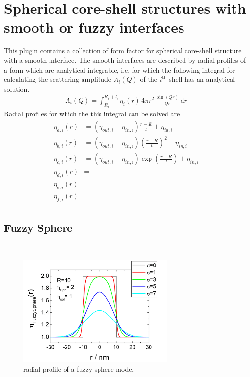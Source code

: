 \clearpage
\section{Spherical core-shell structures with smooth or fuzzy interfaces}
This plugin contains a collection of form factor for spherical core-shell structure with a smooth interface.
The smooth interfaces are described by radial profiles of a form which are analytical integrable, i.e. for which
the following integral for calculating the scattering amplitude $A_i(Q)$ of the $i^\textrm{th}$ shell
has an analytical solution.
\begin{align}
A_i(Q) = \int_{R_i}^{R_i+t_i} \eta_i(r)\, 4\pi r^2 \,\frac{\sin\left( Qr\right)}{Qr} \, \mathrm{d}r
\end{align}
Radial profiles for which the this integral can be solved are
\begin{subequations}
\begin{align}
\eta_{a,i}(r) &= \left(\eta_{out,i}-\eta_{in,i}\right)\frac{r-R}{t}+\eta_{in,i}\\
\eta_{b,i}(r) &= \left(\eta_{out,i}-\eta_{in,i}\right)\left(\frac{r-R}{t}\right)^2+\eta_{in,i}\\
\eta_{c,i}(r) &= \left(\eta_{out,i}-\eta_{in,i}\right)\exp\left(\frac{r-R}{t}\right)+\eta_{in,i}\\
\eta_{d,i}(r) &= \\
\eta_{e,i}(r) &= \\
\eta_{f,i}(r) &= \\
\end{align}
\end{subequations}

\clearpage
\subsection{Fuzzy Sphere}
\label{sect:FuzzySphere} ~\\

\begin{figure}[htb]
\begin{center}
\includegraphics[width=0.7\textwidth,height=0.5\textwidth]{../images/form_factor/FuzzySphere/FuzzySphereProfile.png}
\end{center}
\caption{radial profile of a fuzzy sphere model}
\label{profile:fuzzysphere}
\end{figure}

